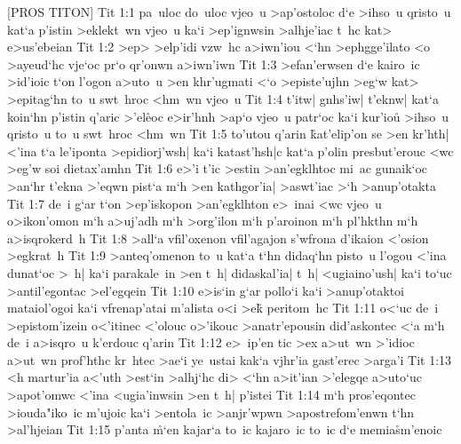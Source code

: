 [PROS TITON]
\vs Tit 1:1
pa~uloc
do~uloc
vjeo~u
>ap'ostoloc
d`e
>ihso~u
qristo~u
kat`a
p'istin
>eklekt~wn
vjeo~u
ka`i
>ep'ignwsin
>alhje'iac
t~hc
kat>
e>us'ebeian\bibvsend
\vs Tit 1:2
>ep>
>elp'idi
vzw~hc
a>iwn'iou
<`hn
>ephgge'ilato
<o
>ayeud`hc
vje`oc
pr`o
qr'onwn
a>iwn'iwn\bibvsend
\vs Tit 1:3
>efan'erwsen
d`e
kairo~ic
>id'ioic
t`on
l'ogon
a>uto~u
>en
khr'ugmati
<`o
>episte'ujhn
>eg`w
kat>
>epitag`hn
to~u
swt~hroc
<hm~wn
vjeo~u\bibvsend
\vs Tit 1:4
t'itw|
gnhs'iw|
t'eknw|
kat`a
koin`hn
p'istin
q'aric
>'el\r{e}oc
e>ir'hnh
>ap`o
vjeo~u
patr`oc
ka`i
kur'iou\r{}
>ihso~u
qristo~u
to~u
swt~hroc
<hm~wn\bibvsend
\vs Tit 1:5
to'utou
q'arin
\r{k}at'elip'on
se
>en
kr'hth|
<'ina
t`a
le'iponta
>epidiorj'wsh|
ka`i
katast'hsh|c
kat`a
p'olin
presbut'erouc
<wc
>eg'w
soi
dietax'amhn\bibvsend
\vs Tit 1:6
e>'i
t'ic
>estin
>an'egklhtoc
mi~ac
gunaik`oc
>an`hr
t'ekna
>'eqwn
pist`a
m`h
>en
kathgor'ia|
>aswt'iac
>`h
>anup'otakta\bibvsend
\vs Tit 1:7
de~i
g`ar
t`on
>ep'iskopon
>an'egklhton
e>~inai
<wc
vjeo~u
o>ikon'omon
m`h
a>uj'adh
m`h
>org'ilon
m`h
p'aroinon
m`h
pl'hkthn
m`h
a>isqrokerd~h\bibvsend
\vs Tit 1:8
>all`a
vfil'oxenon
vfil'agajon
s'wfrona
d'ikaion
<'osion
>egkrat~h\bibvsend
\vs Tit 1:9
>anteq'omenon
to~u
kat`a
t`hn
didaq`hn
pisto~u
l'ogou
<'ina
dunat`oc
>~h|
ka`i
parakale~in
>en
t~h|
didaskal'ia|
t~h|
<ugiaino'ush|
ka`i
to`uc
>antil'egontac
>el'egqein\bibvsend
\vs Tit 1:10
e>is`in
g`ar
pollo`i
ka`i
>anup'otaktoi
mataiol'ogoi
ka`i
vfrenap'atai
m'alista
o<i
>e\r{k}
peritom~hc\bibvsend
\vs Tit 1:11
o<`uc
de~i
>epistom'izein
o<'itinec
<'olouc
o>'ikouc
>anatr'epousin
did'askontec
<`a
m`h
de~i
a>isqro~u
k'erdouc
q'arin\bibvsend
\vs Tit 1:12
e>~ip'en
tic
>ex
a>ut~wn
>'idioc
a>ut~wn
prof'hthc
kr~htec
>ae`i
ye~ustai
kak`a
vjhr'ia
gast'erec
>arga'i\bibvsend
\vs Tit 1:13
<h
martur'ia
a<'uth
>est`in
>alhj`hc
di>
<`hn
a>it'ian
>'elegqe
a>uto`uc
>apot'omwc
<'ina
<ugia'inwsin
>en
t~h|
p'istei\bibvsend
\vs Tit 1:14
m`h
pros'eqontec
>iouda"iko~ic
m'ujoic
ka`i
>entola~ic
>anjr'wpwn
>apostrefom'enwn
t`hn
>al'hjeian\bibvsend
\vs Tit 1:15
p'anta
\r{m}`en
kajar`a
to~ic
kajaro~ic
to~ic
d`e
memia\r{s}m'enoic
